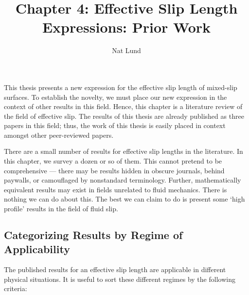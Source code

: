 \documentclass[a4paper]{report}
\title{Chapter 4: Effective Slip Length Expressions: Prior Work}
\author{Nat Lund}
\begin{document}
\maketitle

This thesis presents a new expression for the effective slip length of mixed-slip surfaces.  To establish the novelty, we must place our new expression in the context of other results in this field.  Hence, this chapter is a literature review of the field of effective slip.  The results of this thesis are already published as three papers in this field; thus, the work of this thesis is easily placed in context amongst other peer-reviewed papers.

There are a small number of results for effective slip lengths in the literature.  In this chapter, we survey a dozen or so of them.  This cannot pretend to be comprehensive --- there may be results hidden in obscure journals, behind paywalls, or camouflaged by nonstandard terminology.  Further, mathematically equivalent results may exist in fields unrelated to fluid mechanics.  There is nothing we can do about this.  The best we can claim to do is present some `high profile' results in the field of fluid slip.

\subsection*{Categorizing Results by Regime of Applicability}

The published results for an effective slip length are applicable in different physical situations.  It is useful to sort these different regimes by the following criteria:
\end{document}
